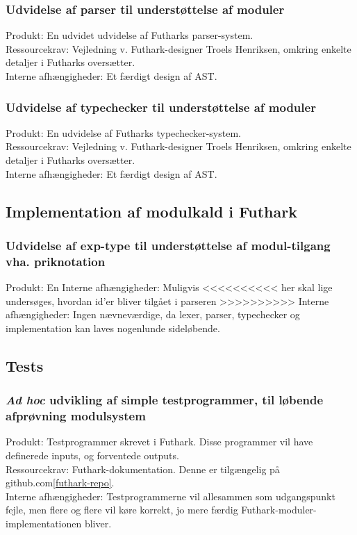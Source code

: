\documentclass[12pt]{article}
\begin{document}
\subsubsection{Udvidelse af parser til understøttelse af moduler}
Produkt: En udvidet udvidelse af Futharks parser-system.\\
Ressourcekrav: Vejledning v. Futhark-designer Troels Henriksen, omkring enkelte
detaljer i Futharks oversætter.\\
Interne afhængigheder: Et færdigt design af AST.
\subsubsection{Udvidelse af typechecker til understøttelse af moduler}
Produkt: En udvidelse af Futharks typechecker-system.\\
Ressourcekrav: Vejledning v. Futhark-designer Troels Henriksen, omkring enkelte
detaljer i Futharks oversætter.\\
Interne afhængigheder: Et færdigt design af AST.

\subsection{Implementation af modulkald i Futhark}
\subsubsection{Udvidelse af exp-type til understøttelse af modul-tilgang vha.
  priknotation}
Produkt: En 
Interne afhængigheder: Muligvis
<<<<<<<<<< her skal lige undersøges, hvordan id'er bliver tilgået i parseren
>>>>>>>>>>
Interne afhængigheder: Ingen nævneværdige, da lexer, parser, typechecker og
implementation kan laves nogenlunde sideløbende.
\subsection{Tests}
\subsubsection{\textit{Ad hoc} udvikling af simple testprogrammer, til løbende afprøvning 
modulsystem}
Produkt: Testprogrammer skrevet i Futhark. Disse programmer vil have definerede
inputs, og forventede outputs.\\
Ressourcekrav: Futhark-dokumentation. Denne er tilgængelig på github.com\ref{futhark-repo}.\\
Interne afhængigheder: Testprogrammerne vil allesammen som udgangspunkt fejle,
men flere og flere vil køre korrekt, jo mere færdig Futhark-moduler-implementationen bliver.
\end{document}
